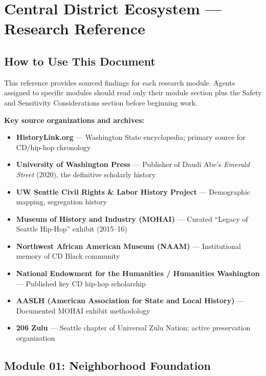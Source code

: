 \documentclass[11pt,letterpaper]{article}
\newcommand{\stageheader}[2]{%
  \noindent\colorbox{#2}{\makebox[\textwidth][l]{%
    \textcolor{white}{\bfseries\sffamily\hspace{6pt}#1\hspace{6pt}}}}%
  \vspace{0.5em}\par%
}
\begin{document}
\newpage
\stageheader{STAGE 2 --- RESEARCH REFERENCE}{secondary}

\section{Central District Ecosystem --- Research Reference}

\subsection{How to Use This Document}

This reference provides sourced findings for each research module. Agents assigned to specific modules should read only their module section plus the Safety and Sensitivity Considerations section before beginning work.

\textbf{Key source organizations and archives:}
\begin{itemize}[noitemsep]
  \item \textbf{HistoryLink.org} --- Washington State encyclopedia; primary source for CD/hip-hop chronology
  \item \textbf{University of Washington Press} --- Publisher of Daudi Abe's \textit{Emerald Street} (2020), the definitive scholarly history
  \item \textbf{UW Seattle Civil Rights \& Labor History Project} --- Demographic mapping, segregation history
  \item \textbf{Museum of History and Industry (MOHAI)} --- Curated ``Legacy of Seattle Hip-Hop'' exhibit (2015--16)
  \item \textbf{Northwest African American Museum (NAAM)} --- Institutional memory of CD Black community
  \item \textbf{National Endowment for the Humanities / Humanities Washington} --- Published key CD hip-hop scholarship
  \item \textbf{AASLH (American Association for State and Local History)} --- Documented MOHAI exhibit methodology
  \item \textbf{206 Zulu} --- Seattle chapter of Universal Zulu Nation; active preservation organization
\end{itemize}

\subsection{Module 01: Neighborhood Foundation}
\end{document}
